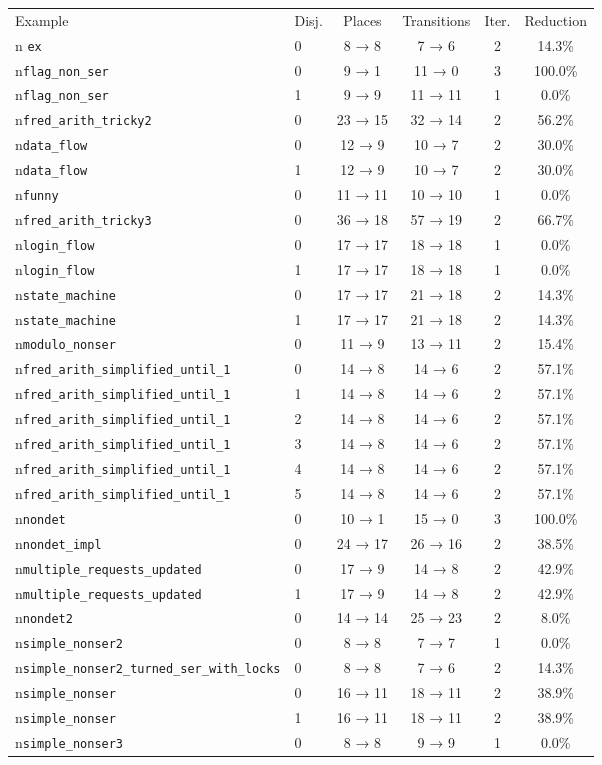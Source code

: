 \begin{tabular}{llcccc}
\toprule
Example & Disj. & Places & Transitions & Iter. & Reduction \\n\midrule
\texttt{ex} & 0 & 8 → 8 & 7 → 6 & 2 & 14.3\% \\n\texttt{flag\_non\_ser} & 0 & 9 → 1 & 11 → 0 & 3 & 100.0\% \\n\texttt{flag\_non\_ser} & 1 & 9 → 9 & 11 → 11 & 1 & 0.0\% \\n\texttt{fred\_arith\_tricky2} & 0 & 23 → 15 & 32 → 14 & 2 & 56.2\% \\n\texttt{data\_flow} & 0 & 12 → 9 & 10 → 7 & 2 & 30.0\% \\n\texttt{data\_flow} & 1 & 12 → 9 & 10 → 7 & 2 & 30.0\% \\n\texttt{funny} & 0 & 11 → 11 & 10 → 10 & 1 & 0.0\% \\n\texttt{fred\_arith\_tricky3} & 0 & 36 → 18 & 57 → 19 & 2 & 66.7\% \\n\texttt{login\_flow} & 0 & 17 → 17 & 18 → 18 & 1 & 0.0\% \\n\texttt{login\_flow} & 1 & 17 → 17 & 18 → 18 & 1 & 0.0\% \\n\texttt{state\_machine} & 0 & 17 → 17 & 21 → 18 & 2 & 14.3\% \\n\texttt{state\_machine} & 1 & 17 → 17 & 21 → 18 & 2 & 14.3\% \\n\texttt{modulo\_nonser} & 0 & 11 → 9 & 13 → 11 & 2 & 15.4\% \\n\texttt{fred\_arith\_simplified\_until\_1} & 0 & 14 → 8 & 14 → 6 & 2 & 57.1\% \\n\texttt{fred\_arith\_simplified\_until\_1} & 1 & 14 → 8 & 14 → 6 & 2 & 57.1\% \\n\texttt{fred\_arith\_simplified\_until\_1} & 2 & 14 → 8 & 14 → 6 & 2 & 57.1\% \\n\texttt{fred\_arith\_simplified\_until\_1} & 3 & 14 → 8 & 14 → 6 & 2 & 57.1\% \\n\texttt{fred\_arith\_simplified\_until\_1} & 4 & 14 → 8 & 14 → 6 & 2 & 57.1\% \\n\texttt{fred\_arith\_simplified\_until\_1} & 5 & 14 → 8 & 14 → 6 & 2 & 57.1\% \\n\texttt{nondet} & 0 & 10 → 1 & 15 → 0 & 3 & 100.0\% \\n\texttt{nondet\_impl} & 0 & 24 → 17 & 26 → 16 & 2 & 38.5\% \\n\texttt{multiple\_requests\_updated} & 0 & 17 → 9 & 14 → 8 & 2 & 42.9\% \\n\texttt{multiple\_requests\_updated} & 1 & 17 → 9 & 14 → 8 & 2 & 42.9\% \\n\texttt{nondet2} & 0 & 14 → 14 & 25 → 23 & 2 & 8.0\% \\n\texttt{simple\_nonser2} & 0 & 8 → 8 & 7 → 7 & 1 & 0.0\% \\n\texttt{simple\_nonser2\_turned\_ser\_with\_locks} & 0 & 8 → 8 & 7 → 6 & 2 & 14.3\% \\n\texttt{simple\_nonser} & 0 & 16 → 11 & 18 → 11 & 2 & 38.9\% \\n\texttt{simple\_nonser} & 1 & 16 → 11 & 18 → 11 & 2 & 38.9\% \\n\texttt{simple\_nonser3} & 0 & 8 → 8 & 9 → 9 & 1 & 0.0\% 
\end{tabular}
